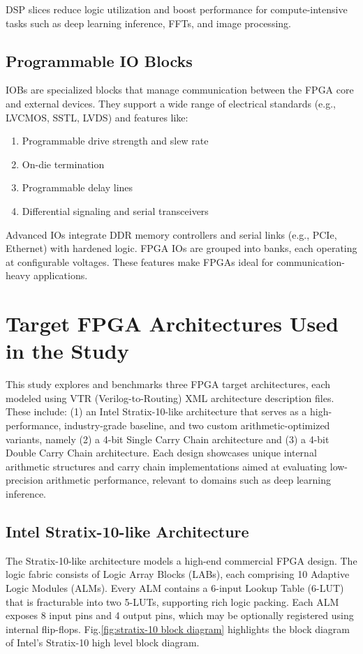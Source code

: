 DSP slices reduce logic utilization and boost performance for compute-intensive tasks such as deep learning inference, FFTs, and image processing. 

\subsection{Programmable IO Blocks}
IOBs are specialized blocks that manage communication between the FPGA core and external devices. They support a wide range of electrical standards (e.g., LVCMOS, SSTL, LVDS) and features like:
\begin{enumerate}
	\item Programmable drive strength and slew rate
	\item On-die termination
	\item Programmable delay lines
	\item Differential signaling and serial transceivers
\end{enumerate}

Advanced IOs integrate DDR memory controllers and serial links (e.g., PCIe, Ethernet) with hardened logic. FPGA IOs are grouped into banks, each operating at configurable voltages. These features make FPGAs ideal for communication-heavy applications.


\section{Target FPGA Architectures Used in the Study}
This study explores and benchmarks three FPGA target architectures, each modeled using VTR (Verilog-to-Routing) XML architecture description files. These include: (1) an Intel Stratix-10-like architecture that serves as a high-performance, industry-grade baseline, and two custom arithmetic-optimized variants, namely (2) a 4-bit Single Carry Chain architecture and (3) a 4-bit Double Carry Chain architecture. Each design showcases unique internal arithmetic structures and carry chain implementations aimed at evaluating low-precision arithmetic performance, relevant to domains such as deep learning inference.

\subsection{Intel Stratix-10-like Architecture}
The Stratix-10-like architecture models a high-end commercial FPGA design. The logic fabric consists of Logic Array Blocks (LABs), each comprising 10 Adaptive Logic Modules (ALMs). Every ALM contains a 6-input Lookup Table (6-LUT) that is fracturable into two 5-LUTs, supporting rich logic packing. Each ALM exposes 8 input pins and 4 output pins, which may be optionally registered using internal flip-flops\cite{target-arch-1}. Fig.\ref{fig:stratix-10 block diagram} highlights the block diagram of Intel's Stratix-10 high level block diagram.

